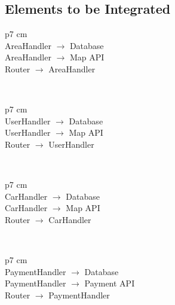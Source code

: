 \subsection{Elements to be Integrated}
	\begin{tabular}{ p{7 cm} }
		\hline
		 \\
		\hline
		AreaHandler  $ \rightarrow $  Database \\ \hline
		AreaHandler $ \rightarrow $ Map API \\ \hline
		Router $ \rightarrow $ AreaHandler \\ \hline
		\vspace{1mm}
	\end{tabular}
	\\
    \begin{tabular}{ p{7 cm} }
      \hline
       \\
      \hline
      UserHandler  $ \rightarrow $  Database \\ \hline
      UserHandler $ \rightarrow $ Map API \\ \hline
      Router $ \rightarrow $ UserHandler \\ \hline
      \vspace{1mm}
    \end{tabular}
    \\
    \begin{tabular}{ p{7 cm} }
      \hline
       \\
      \hline
      CarHandler $ \rightarrow $ Database \\ \hline
      CarHandler $ \rightarrow $ Map API \\ \hline
      Router $ \rightarrow $ CarHandler \\ \hline
      \vspace{1mm}
    \end{tabular}
    \\
    \begin{tabular}{ p{7 cm} }
      \hline
       \\
      \hline
      PaymentHandler $ \rightarrow $ Database \\ \hline
      PaymentHandler $ \rightarrow $ Payment API \\ \hline
      Router $ \rightarrow $ PaymentHandler \\ \hline
      \vspace{1mm}
    \end{tabular}

